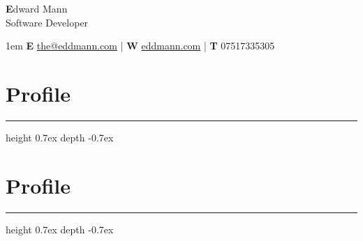 \documentclass[10pt,letterpaper]{article}
\makeatletter
\def\name{Edward Mann}
\def\role{Software Developer}
\def\email{\href{mailto:the@eddmann.com}{the@eddmann.com}}
\def\web{\href{http://eddmann.com/}{eddmann.com}}
\def\telephone{07517335305}
\def\Vhrulefill{\leavevmode\leaders\hrule height 0.7ex depth \dimexpr0.1pt-0.7ex\hfill\kern0pt}
\makeatother
\begin{document}
\begin{center}
    \huge \textbf \name \\
    \vspace{2mm}
    \textcolor{black!40}{\large \role} \\
    \vspace{2mm}
    \begin{normalsize}
        \spaceskip 1em
        \textbf{E} \email \hspace{1pt} |
        \textbf{W} \web \hspace{1pt} |
        \textbf{T} \telephone
    \end{normalsize}
\end{center}

\renewcommand{\baselinestretch}{1.6}\normalsize

\section*{Profile}

\Vhrulefill

\lipsum[1]

\section*{Profile}

\Vhrulefill

\lipsum[1]
\end{document}
